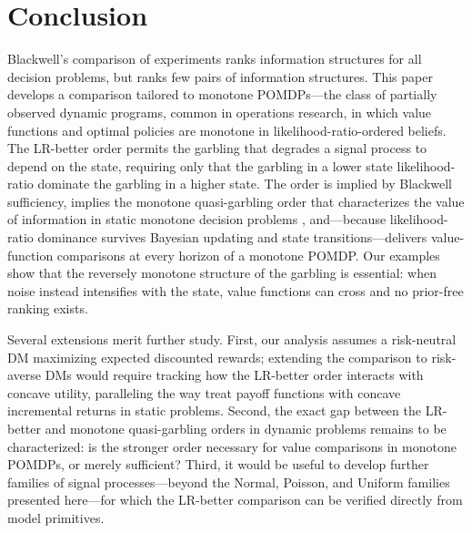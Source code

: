 \section{Conclusion}\label{sec:conclusion}

Blackwell's comparison of experiments ranks information structures for
all decision problems, but ranks few pairs of information structures.
This paper develops a comparison tailored to monotone POMDPs---the
class of partially observed dynamic programs, common in operations
research, in which value functions and optimal policies are monotone
in likelihood-ratio-ordered beliefs. The LR-better order permits the
garbling that degrades a signal process to depend on the state,
requiring only that the garbling in a lower state likelihood-ratio
dominate the garbling in a higher state. The order is implied by
Blackwell sufficiency, implies the monotone quasi-garbling order that
characterizes the value of information in static monotone decision
problems \citep{kim2023comparing}, and---because likelihood-ratio
dominance survives Bayesian updating and state transitions---delivers
value-function comparisons at every horizon of a monotone POMDP. Our
examples show that the reversely monotone structure of the garbling is
essential: when noise instead intensifies with the state, value
functions can cross and no prior-free ranking exists.

Several extensions merit further study. First, our analysis assumes a
risk-neutral DM maximizing expected discounted rewards; extending the
comparison to risk-averse DMs would require tracking how the LR-better
order interacts with concave utility, paralleling the way
\citet{athey2018value} treat payoff functions with concave incremental
returns in static problems.  Second, the exact gap between the LR-better and monotone
quasi-garbling orders in dynamic problems remains to be
characterized: is the stronger order necessary for value comparisons
in monotone POMDPs, or merely sufficient? Third, it would be useful to
develop further families of signal processes---beyond the Normal,
Poisson, and Uniform families presented here---for which the
LR-better comparison can be verified directly from model primitives.
